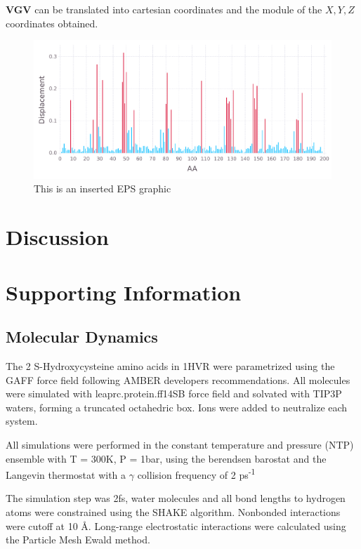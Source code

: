 \documentclass[10pt,letterpaper]{article}
\begin{document}
\FloatBarrier


\textbf{VGV} can be translated into cartesian coordinates and the module of the \(X, Y, Z\) coordinates obtained.

\begin{figure}[ht]
\begin{center}
\includegraphics[scale=0.5]{1hvr_apo/5figure.pdf}
\caption{This is an inserted EPS graphic}
\label{fig13}
\end{center}
\end{figure}

\FloatBarrier
\newpage

\section{Discussion}

\newpage
\section{Supporting Information}
\subsection{Molecular Dynamics}
\label{Molecular Dynamics}
The 2 S-Hydroxycysteine amino acids in 1HVR were parametrized using the GAFF force field following AMBER developers recommendations. All molecules were simulated with leaprc.protein.ff14SB force field and solvated with TIP3P waters, forming a truncated octahedric box. Ions were added to neutralize each system.

All simulations were performed in the constant temperature and pressure (NTP) ensemble with T = 300K, P = 1bar, using the berendsen barostat and the Langevin thermostat with a \textbf{$\gamma$} collision frequency of 2 ps\textsuperscript{-1}

The simulation step was 2fs, water molecules and all bond lengths to hydrogen atoms were constrained using the SHAKE algorithm. Nonbonded interactions were cutoff at 10 \AA . Long-range electrostatic interactions were calculated using the Particle Mesh Ewald method.
\end{document}

